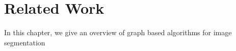\chapter{Related Work} \label{ch:reated_work}

In this chapter, we give an overview of graph based algorithms
for image segmentation 

 

 

 

% 

% 

 



